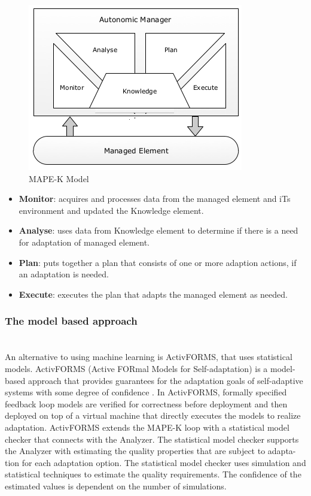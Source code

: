 \documentclass[pdftex,english,oribibl]{llncs}
\begin{document}
\begin{figure}[H]
\centering
	\includegraphics[totalheight=6cm]{figures/mapek}
    \caption{MAPE-K Model \citep{softwareEngineeringSA}}
    \label{fig:mapek}
\end{figure}
\begin{itemize}
           \item \textbf{Monitor}: acquires and processes data from the managed element and
              iTs environment and updated the Knowledge element.
           \item \textbf{Analyse}: uses data from Knowledge element to determine if there is
              a need for adaptation of managed element.
           \item \textbf{Plan}: puts together a plan that consists of one or more adaption
              actions, if an adaptation is needed.
           \item \textbf{Execute}: executes the plan that adapts the managed element as
              needed.
\end{itemize}
\subsubsection{The model based approach  \\\\}
An alternative to using machine learning is ActivFORMS, that uses statistical models.
ActivFORMS (Active FORmal Models for Self-adaptation) is a model-based
approach that provides guarantees for the adaptation goals of self-adaptive systems with some degree of confidence \citep{softwareEngineeringSA}. In ActivFORMS, formally specified
feedback loop models are verified for correctness before deployment and then deployed on top of a virtual machine that directly executes the models to realize
adaptation. ActivFORMS extends the MAPE-K loop with a statistical model
checker that connects with the Analyzer. The statistical model checker supports
the Analyzer with estimating the quality properties that are subject to adapta-
tion for each adaptation option. The statistical model checker uses simulation
and statistical techniques to estimate the quality requirements. The confidence
of the estimated values is dependent on the number of simulations.
\pagebreak
\end{document}
